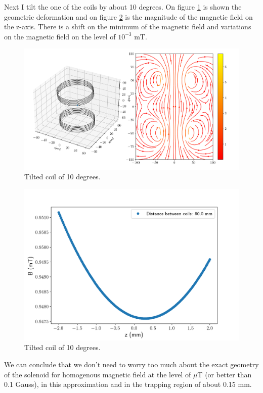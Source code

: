 \documentclass[
10pt, %
a4paper, %
oneside, %
headinclude,footinclude, %
BCOR5mm, %
]{scrartcl}
\begin{document}
Next I tilt the one of the coils by about 10 degrees. On figure \ref{tilted_coil} is shown the geometric deformation and on figure \ref{tilted_coil_B} is the magnitude of the magnetic field on the z-axis. There is a shift on the minimum of the magnetic field and variations on the magnetic field on the level of $10^{-3}$ mT.

\begin{figure}[t]
    \includegraphics[width=\linewidth]{Tilted_coil_10Deg}
    \centering
    \caption{Tilted coil of 10 degrees.}
    \label{tilted_coil}
\end{figure}

\begin{figure}[t]
    \includegraphics[width=\linewidth]{TiltedCoil10Deg_B}
    \centering
    \caption{Tilted coil of 10 degrees.}
    \label{tilted_coil_B}
\end{figure}

We can conclude that we don't need to worry too much about the exact geometry of the solenoid for homogenous magnetic field at the level of $\mu$T (or better than 0.1 Gauss), in this approximation and in the trapping region of about 0.15 mm. 
\end{document}
